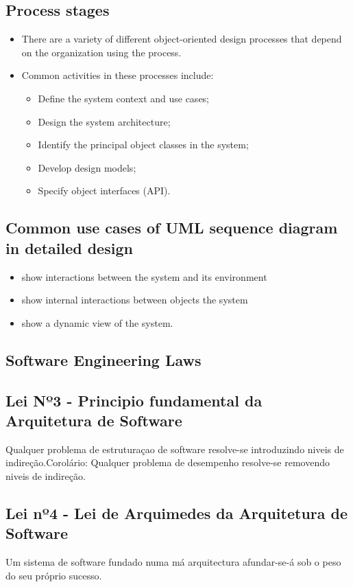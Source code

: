 \documentclass[../ESOF_notes.tex]{subfiles}
\begin{document}
\subsection{Process stages}
\begin{itemize}
    \item There are a variety of different object-oriented design processes that depend on the organization using the process.
    \item Common activities in these processes include:
          \begin{itemize}
              \item Define the system context and use cases;
              \item Design the system architecture;
              \item Identify the principal object classes in the system;
              \item Develop design models;
              \item Specify object interfaces (API).
          \end{itemize}
\end{itemize}

\subsection{Common use cases of UML sequence diagram in detailed design}
\begin{itemize}
    \item show interactions between the system and its environment
    \item show internal interactions between objects the system
    \item show a dynamic view of the system.
\end{itemize}


\subsection{Software Engineering Laws}

\subsection{Lei Nº3 - Principio fundamental da Arquitetura de Software}
Qualquer problema de estruturaçao de software resolve-se introduzindo niveis de indireção.\newline Corolário: Qualquer problema de desempenho resolve-se removendo niveis de indireção.

\subsection{Lei nº4 - Lei de Arquimedes da Arquitetura de Software}
Um sistema de software fundado numa má arquitectura afundar-se-á sob o peso do seu próprio sucesso.
\end{document}
